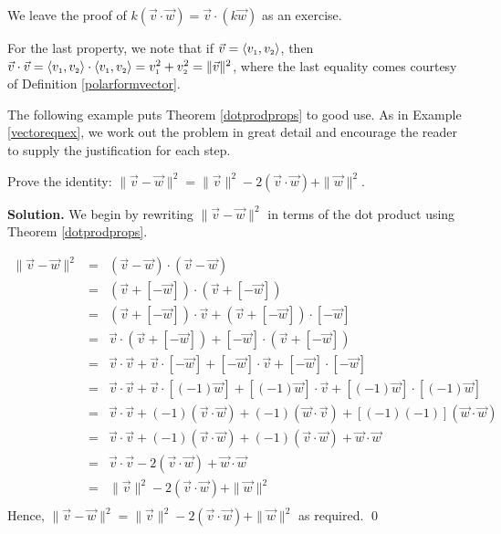 \documentclass{ximera}
\begin{document}
We leave the proof of $k(\vec{v} \cdot \vec{w}) = \vec{v} \cdot (k \vec{w})$ as an exercise.

\smallskip

For the last property, we note that if  $\vec{v} = \left<v_{\mbox{\tiny $1$}},v_{\mbox{\tiny $2$}}\right>$, then $\vec{v} \cdot \vec{v} = \left<v_{\mbox{\tiny $1$}},v_{\mbox{\tiny $2$}}\right> \cdot \left<v_{\mbox{\tiny $1$}},v_{\mbox{\tiny $2$}}\right> = v_{\mbox{\tiny $1$}}^2 + v_{\mbox{\tiny $2$}}^2 = \|\vec{v}\|^2$, where the last equality comes courtesy of Definition \ref{polarformvector}.

\smallskip

The following example puts Theorem \ref{dotprodprops} to good use.  As in Example \ref{vectoreqnex}, we work out the problem in great detail and encourage the reader to supply the justification for each step.

\begin{ex}  \label{dotprodpropex}  Prove the identity:  $\| \vec{v} - \vec{w} \|^2 =  \|\vec{v}\|^2  -2 (\vec{v}\cdot\vec{w}) + \|\vec{w}\|^2$.

\smallskip

{\bf Solution.} We begin by rewriting  $\| \vec{v} - \vec{w} \|^2$ in terms of the dot product using Theorem \ref{dotprodprops}.

\[ \begin{array}{rcl}

\| \vec{v} - \vec{w} \|^2 & = & (\vec{v} - \vec{w}) \cdot (\vec{v} - \vec{w})  \\ [3pt]
													& = & (\vec{v} + [-\vec{w}]) \cdot (\vec{v} + [-\vec{w}]) \\ [3pt]										
													& = &  (\vec{v} + [-\vec{w}]) \cdot \vec{v}  +(\vec{v} + [-\vec{w}]) \cdot [-\vec{w}]  \\ [3pt]		
													& = & \vec{v} \cdot (\vec{v} + [-\vec{w}])  + [-\vec{w}] \cdot (\vec{v} + [-\vec{w}]) \\ [3pt]
													& = & \vec{v} \cdot \vec{v} + \vec{v} \cdot [-\vec{w}] + [-\vec{w}]\cdot \vec{v} + [-\vec{w}]\cdot[-\vec{w}] \\ [3pt]
													& = & \vec{v} \cdot \vec{v} + \vec{v} \cdot [(-1)\vec{w}] + [(-1)\vec{w}]\cdot \vec{v} + [(-1)\vec{w}]\cdot[(-1)\vec{w}] \\ [3pt]	
													& = & \vec{v} \cdot \vec{v} + (-1)(\vec{v} \cdot \vec{w}) + (-1)(\vec{w} \cdot \vec{v}) + [(-1)(-1)](\vec{w}\cdot\vec{w}) \\ [3pt]	
													& = & \vec{v} \cdot \vec{v} + (-1)(\vec{v} \cdot \vec{w}) + (-1)(\vec{v} \cdot \vec{w}) + \vec{w}\cdot\vec{w} \\ [3pt]
												  & = & \vec{v} \cdot \vec{v} -2(\vec{v} \cdot \vec{w}) + \vec{w}\cdot\vec{w} \\ [3pt]
													& = & \|\vec{v}\|^2-2(\vec{v} \cdot \vec{w}) + \|\vec{w}\|^2 \\ \end{array} \]
Hence,  $\| \vec{v} - \vec{w} \|^2 =  \|\vec{v}\|^2  -2 (\vec{v}\cdot\vec{w}) + \|\vec{w}\|^2$ as required.  \qed

\end{ex} 
\end{document}
